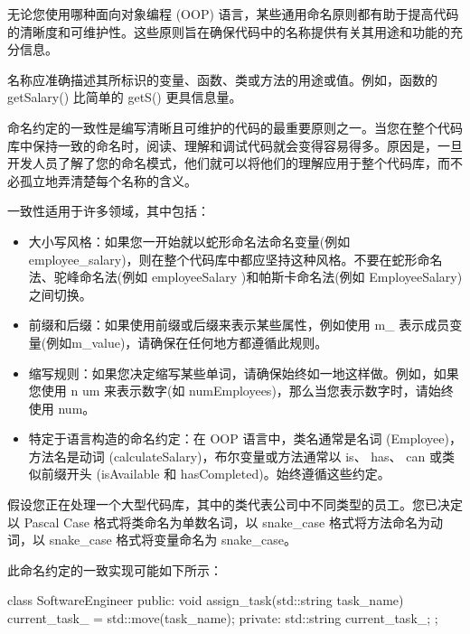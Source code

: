 
无论您使用哪种面向对象编程 (OOP) 语言，某些通用命名原则都有助于提高代码的清晰度和可维护性。这些原则旨在确保代码中的名称提供有关其用途和功能的充分信息。


名称应准确描述其所标识的变量、函数、类或方法的用途或值。例如，函数的 getSalary() 比简单的 getS() 更具信息量。


命名约定的一致性是编写清晰且可维护的代码的最重要原则之一。当您在整个代码库中保持一致的命名时，阅读、理解和调试代码就会变得容易得多。原因是，一旦开发人员了解了您的命名模式，他们就可以将他们的理解应用于整个代码库，而不必孤立地弄清楚每个名称的含义。

一致性适用于许多领域，其中包括：

\begin{itemize}
\item
大小写风格：如果您一开始就以蛇形命名法命名变量(例如 employee\_salary)，则在整个代码库中都应坚持这种风格。不要在蛇形命名法、驼峰命名法(例如 employeeSalary )和帕斯卡命名法(例如 EmployeeSalary)之间切换。

\item
前缀和后缀：如果使用前缀或后缀来表示某些属性，例如使用 m\_ 表示成员变量(例如m\_value)，请确保在任何地方都遵循此规则。

\item
缩写规则：如果您决定缩写某些单词，请确保始终如一地这样做。例如，如果您使用 n um 来表示数字(如 numEmployees)，那么当您表示数字时，请始终使用 num。

\item
特定于语言构造的命名约定：在 OOP 语言中，类名通常是名词 (Employee)，方法名是动词 (calculateSalary)，布尔变量或方法通常以 is、 has、 can 或类似前缀开头 (isAvailable 和 hasCompleted)。始终遵循这些约定。
\end{itemize}

假设您正在处理一个大型代码库，其中的类代表公司中不同类型的员工。您已决定以 Pascal Case 格式将类命名为单数名词，以 snake\_case 格式将方法命名为动词，以 snake\_case 格式将变量命名为 snake\_case。

此命名约定的一致实现可能如下所示：

\begin{cpp}
class SoftwareEngineer {
public:
    void assign_task(std::string task_name) {
        current_task_ = std::move(task_name);
    }
private:
    std::string current_task_;
};
\end{cpp}

